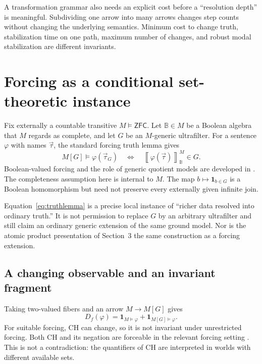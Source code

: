 \documentclass[11pt,letterpaper]{article}
\theoremstyle{definition}
\newcommand{\ZFC}{\mathsf{ZFC}}
\newcommand{\bnorm}[1]{\left\llbracket #1\right\rrbracket}
\begin{document}
A transformation grammar also needs an explicit cost before a ``resolution depth'' is meaningful. Subdividing one arrow into many arrows changes step counts without changing the underlying semantics. Minimum cost to change truth, stabilization time on one path, maximum number of changes, and robust modal stabilization are different invariants.

\section{Forcing as a conditional set-theoretic instance}\label{sec:forcing}
Fix externally a countable transitive $M\models\ZFC$. Let $\mathbb B\in M$ be a Boolean algebra that $M$ regards as complete, and let $G$ be an $M$-generic ultrafilter. For a sentence $\varphi$ with names $\vec\tau$, the standard forcing truth lemma gives
\begin{equation}\label{eq:truthlemma}
M[G]\models\varphi(\vec\tau_G)
\quad\Longleftrightarrow\quad
\bnorm{\varphi(\vec\tau)}_{\mathbb B}^{M}\in G.
\end{equation}
Boolean-valued forcing and the role of generic quotient models are developed in \cite{hamkinsseabold}. The completeness assumption here is internal to $M$. The map $b\mapsto\mathbf1_{b\in G}$ is a Boolean homomorphism but need not preserve every externally given infinite join.

Equation~\eqref{eq:truthlemma} is a precise local instance of ``richer data resolved into ordinary truth.'' It is not permission to replace $G$ by an arbitrary ultrafilter and still claim an ordinary generic extension of the same ground model. Nor is the atomic product presentation of Section~3 the same construction as a forcing extension.

\subsection{A changing observable and an invariant fragment}
Taking two-valued fibers and an arrow $M\to M[G]$ gives
\[
D_f(\varphi)=\mathbf1_{M\models\varphi}
+\mathbf1_{M[G]\models\varphi}.
\]
For suitable forcing, CH can change, so it is not invariant under unrestricted forcing. Both CH and its negation are forceable in the relevant forcing setting \cite{asperoviale}. This is not a contradiction: the quantifiers of CH are interpreted in worlds with different available sets.
\end{document}

